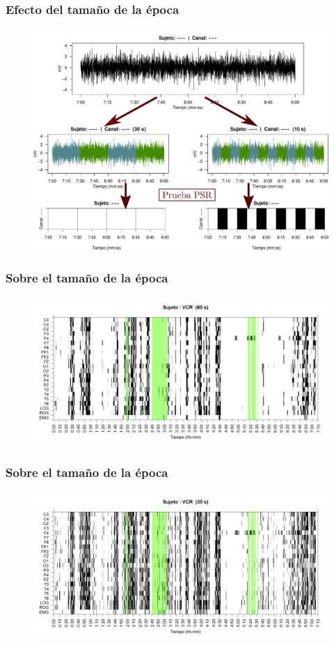 \documentclass[11pt]{beamer}
\begin{document}
\begin{frame}\frametitle{Efecto del tama\~no de la \'epoca}
\begin{figure}
\centering
\includegraphics[width=0.9\linewidth]{./img_diagramas/epocas_diferentes.pdf}
\end{figure}
\end{frame}

\begin{frame}\frametitle{Sobre el tama\~no de la \'epoca}
\begin{figure}
\centering
\includegraphics[width=0.9\linewidth]
{./img_ejemplos/VCNNS1_est_60.png} 
\end{figure}
\end{frame}

\begin{frame}\frametitle{Sobre el tama\~no de la \'epoca}
\begin{figure}
\centering
\includegraphics[width=0.9\linewidth]
{./img_ejemplos/VCNNS1_est_30.png} 
\end{figure}
\end{frame}
\end{document}
